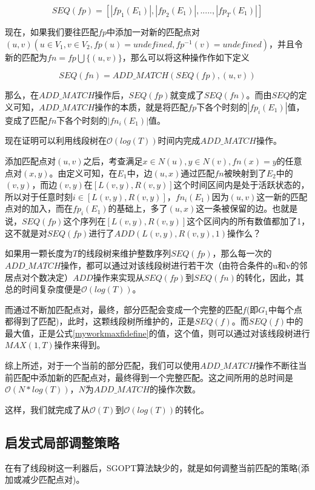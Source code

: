 \begin{equation}\label{myworkfseqdefine}    
SEQ(fp)=[|fp_1(E_1)|,|fp_2(E_1)|,.....,|fp_T(E_1)|]
\end{equation}

现在，如果我们要往匹配$fp$中添加一对新的匹配点对$(u,v)(u\in V_1,v\in V_2,fp(u)=undefined,fp^{-1}(v)=undefined)$，并且令新的匹配为$fn=fp\bigcup \{(u,v)\}$，那么可以将这种操作作如下定义

\begin{equation}\label{myworkfadddefine}    
SEQ(fn)=ADD\_MATCH(SEQ(fp),(u,v))
\end{equation}

那么，在$ADD\_MATCH$操作后，$SEQ(fp)$就变成了$SEQ(fn)$。而由$SEQ$的定义可知，$ADD\_MATCH$操作的本质，就是将匹配$fp$下各个时刻的$|fp_i(E_1)|$值，变成了匹配$fn$下各个时刻的$|fn_i(E_1)|$值。

现在证明可以利用线段树在$\mathcal{O}(log(T))$时间内完成$ADD\_MATCH$操作。

添加匹配点对$(u,v)$之后，考查满足$x\in N(u),y\in N(v),fn(x)=y$的任意点对$(x,y)$。由定义可知，在$E_1$中，边$(u,x)$通过匹配$fn$被映射到了$E_2$中的$(v,y)$，而边$(v,y)$在$[L(v,y),R(v,y)]$这个时间区间内是处于活跃状态的，所以对于任意时刻$i\in [L(v,y),R(v,y)]$，$fn_i(E_1)$因为$(u,v)$这一新的匹配点对的加入，而在$fp_i(E_1)$的基础上，多了$(u,x)$这一条被保留的边。也就是说，$SEQ(fp)$这个序列在$[L(v,y),R(v,y)]$这个区间内的所有数值都加了1，这不就是对$SEQ(fp)$进行了$ADD(L(v,y),R(v,y),1)$操作么？

如果用一颗长度为$T$的线段树来维护整数序列$SEQ(fp)$，那么每一次的$ADD\_MATCH$操作，都可以通过对该线段树进行若干次（由符合条件的u和v的邻居点对个数决定）$ADD$操作来实现从$SEQ(fp)$到$SEQ(fn)$的转化，因此，其总的时间复杂度便是$\mathcal{O}(log(T))$。

而通过不断加匹配点对，最终，部分匹配会变成一个完整的匹配$f$(即$G_1$中每个点都得到了匹配)，此时，这颗线段树所维护的，正是$SEQ(f)$。而$SEQ(f)$中的最大值，正是公式\ref{myworkmaxfidefine}的值，这个值，则可以通过对该线段树进行$MAX(1,T)$操作来得到。

综上所述，对于一个当前的部分匹配，我们可以使用$ADD\_MATCH$操作不断往当前匹配中添加新的匹配点对，最终得到一个完整匹配。这之间所用的总时间是$\mathcal{O}(N*log(T))$，$N$为$ADD\_MATCH$的操作次数。

这样，我们就完成了从$\mathcal{O}(T)$到$\mathcal{O}(log(T))$的转化。

\subsection{启发式局部调整策略}
在有了线段树这一利器后，SGOPT算法缺少的，就是如何调整当前匹配的策略(添加或减少匹配点对)。

